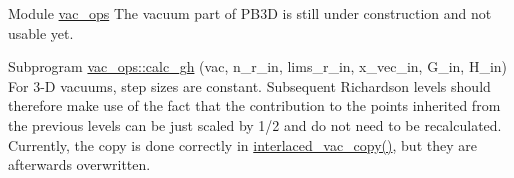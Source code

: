 
\begin{DoxyRefList}
\item[Module \mbox{\hyperlink{namespacevac__ops}{vac\+\_\+ops}} ]\label{todo__todo000001}%
%
The vacuum part of P\+B3D is still under construction and not usable yet.  
\item[Subprogram \mbox{\hyperlink{namespacevac__ops_a7e3f92fbe9fa6cf3de6ac301676b96d1}{vac\+\_\+ops::calc\+\_\+gh}} (vac, n\+\_\+r\+\_\+in, lims\+\_\+r\+\_\+in, x\+\_\+vec\+\_\+in, G\+\_\+in, H\+\_\+in)]\label{todo__todo000002}%
%
For 3-\/D vacuums, step sizes are constant. Subsequent Richardson levels should therefore make use of the fact that the contribution to the points inherited from the previous levels can be just scaled by 1/2 and do not need to be recalculated. Currently, the copy is done correctly in \mbox{\hyperlink{namespacevac__utilities_a8e7889688701f6ac2fd2c60cdee2b96a}{interlaced\+\_\+vac\+\_\+copy()}}, but they are afterwards overwritten.
\end{DoxyRefList}